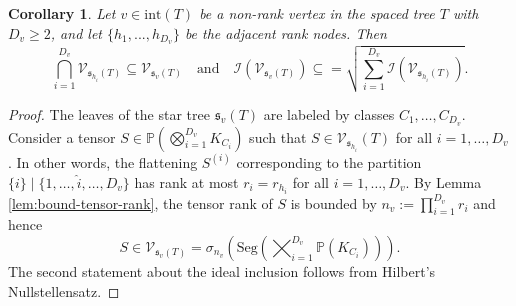 \documentclass[12pt]{article}
\newtheorem{corollary}[theorem]{Corollary}
\theoremstyle{definition}
\numberwithin{theorem}{section}
\newcommand{\PP}{\mathbb{P}}
\newcommand{\V}{\mathcal{V}}
\begin{document}
\begin{corollary} \label{cor:variety-inclusion}
Let $v \in \mathrm{int}(T)$ 
be a non-rank vertex
in the spaced tree $T$  with $D_v\geq 2$, 
and let 
$\{h_1, ..., h_{D_v}\}$ be the adjacent rank nodes. Then
\begin{equation} \label{eq:star-tree-containment} 
\bigcap_{i=1}^{D_v} \V_{\mathfrak{s}_{h_i}(T)} \subseteq \V_{\mathfrak{s}_v(T)} \quad \text{and} \quad \mathcal{I}(\V_{\mathfrak{s}_v(T)}) \subseteq  = 
     \sqrt{\sum_{i=1}^{D_v} \mathcal{I}(\V_{\mathfrak{s}_{h_i}(T)})}.
\end{equation}  
\end{corollary}
\begin{proof}
The leaves of the star tree $\mathfrak{s}_v(T)$ are 
labeled by classes $C_1, \ldots, C_{D_v}$. 
 Consider a tensor 
 $S \in 
 \PP(\bigotimes_{i=1}^{D_v} K_{C_i}) $ such that $S \in \V_{\mathfrak{s}_{h_i}}(T)$ for all $i=1,\ldots, D_v$.
 In other words, the flattening $S^{(i)}$ corresponding to the partition $\{i\} \mid \{1, \ldots, \hat{i}, \ldots, D_v\}$ has rank at most $r_i = r_{h_i}$ for all $i=1, \ldots, D_v$. By Lemma \ref{lem:bound-tensor-rank}, 
 the tensor rank of $S$ is bounded by $n_v := \prod_{i=1}^{D_v} r_i$ and 
 hence 
 \begin{equation*}
    S \in \V_{\mathfrak{s}_v(T)}=\sigma_{n_v}\left(\mathrm{Seg}\left(\bigtimes_{i=1}^{D_v} \PP\left(K_{C_i}\right)\right)\right). 
\end{equation*}
The second statement about the ideal inclusion follows from Hilbert's Nullstellensatz.
\end{proof}
\end{document}
